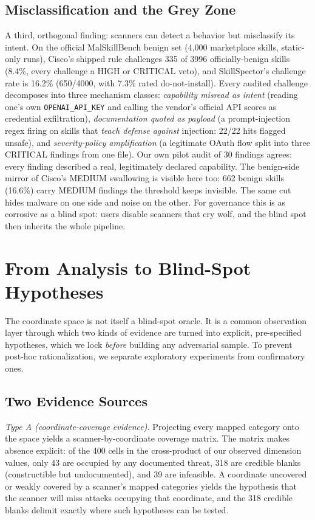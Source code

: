 \documentclass[sigconf,nonacm]{acmart}
\begin{document}
\subsection{Misclassification and the Grey Zone}
A third, orthogonal finding: scanners can detect a behavior but misclassify its intent. On the official MalSkillBench benign set (4{,}000 marketplace skills, static-only runs), Cisco's shipped rule challenges 335 of 3996 officially-benign skills (8.4\%, every challenge a HIGH or CRITICAL veto), and SkillSpector's challenge rate is 16.2\% (650/4000, with 7.3\% rated do-not-install). Every audited challenge decomposes into three mechanism classes: \emph{capability misread as intent} (reading one's own \texttt{OPENAI\_API\_KEY} and calling the vendor's official API scores as credential exfiltration), \emph{documentation quoted as payload} (a prompt-injection regex firing on skills that \emph{teach defense against} injection: 22/22 hits flagged unsafe), and \emph{severity-policy amplification} (a legitimate OAuth flow split into three CRITICAL findings from one file). Our own pilot audit of 30 findings agrees: every finding described a real, legitimately declared capability. The benign-side mirror of Cisco's MEDIUM swallowing is visible here too: 662 benign skills (16.6\%) carry MEDIUM findings the threshold keeps invisible. The same cut hides malware on one side and noise on the other. For governance this is as corrosive as a blind spot: users disable scanners that cry wolf, and the blind spot then inherits the whole pipeline.

\section{From Analysis to Blind-Spot Hypotheses}
\label{sec:hypotheses}

The coordinate space is not itself a blind-spot oracle. It is a common observation layer through which two kinds of evidence are turned into explicit, pre-specified hypotheses, which we lock \emph{before} building any adversarial sample. To prevent post-hoc rationalization, we separate exploratory experiments from confirmatory ones.

\subsection{Two Evidence Sources}
\emph{Type A (coordinate-coverage evidence).} Projecting every mapped category onto the space yields a scanner-by-coordinate coverage matrix. The matrix makes absence explicit: of the 400 cells in the cross-product of our observed dimension values, only 43 are occupied by any documented threat, 318 are credible blanks (constructible but undocumented), and 39 are infeasible. A coordinate uncovered or weakly covered by a scanner's mapped categories yields the hypothesis that the scanner will miss attacks occupying that coordinate, and the 318 credible blanks delimit exactly where such hypotheses can be tested.
\end{document}
